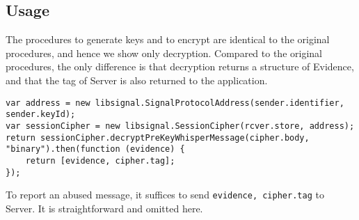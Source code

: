 \documentclass{article}
\begin{document}
\subsection{Usage}
\label{sec:usage}

The procedures to generate keys and to encrypt are 
identical to the original procedures,
and hence we show only decryption.
Compared to the original procedures,
the only difference is that decryption returns a structure of Evidence,
and that the tag of Server is also returned to 
the application.
{\small
\begin{verbatim}
var address = new libsignal.SignalProtocolAddress(sender.identifier, sender.keyId);
var sessionCipher = new libsignal.SessionCipher(rcver.store, address);
return sessionCipher.decryptPreKeyWhisperMessage(cipher.body, "binary").then(function (evidence) {
    return [evidence, cipher.tag];
});
\end{verbatim}
}
To report an abused message, 
it suffices to send {\tt evidence, cipher.tag} to Server.
It is straightforward and omitted here.
















\end{document}
